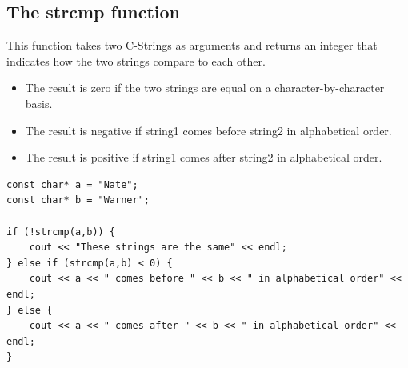 \documentclass{report}
\begin{document}
    \pagebreak \bigbreak \noindent 
    \subsection{The strcmp function}
    \bigbreak \noindent 
    This function takes two C-Strings as arguments and returns an integer that indicates how the two strings compare to each other. 
    \begin{itemize}
        \item The result is zero if the two strings are equal on a character-by-character basis.
        \item The result is negative if string1 comes before string2 in alphabetical order.
        \item The result is positive if string1 comes after string2 in alphabetical order.
    \end{itemize}
    \bigbreak \noindent 
    \sepline
    \begin{verbatim}
const char* a = "Nate";
const char* b = "Warner";

if (!strcmp(a,b)) {
    cout << "These strings are the same" << endl;
} else if (strcmp(a,b) < 0) {
    cout << a << " comes before " << b << " in alphabetical order" << endl;
} else {
    cout << a << " comes after " << b << " in alphabetical order" << endl;
}
    \end{verbatim}
    \sepline

    \bigbreak \noindent 
\end{document}
